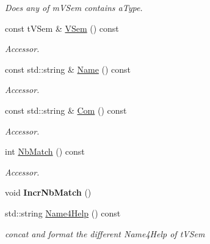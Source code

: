 \begin{DoxyCompactItemize}
\begin{DoxyCompactList}\small\item\em Does any of m\+V\+Sem contains a\+Type. \end{DoxyCompactList}\item 
const t\+V\+Sem \& \hyperlink{classMMVII_1_1cSpecOneArg2007_a4c67e22ddba5a312ef96af49e43d5260}{V\+Sem} () const \hypertarget{classMMVII_1_1cSpecOneArg2007_a4c67e22ddba5a312ef96af49e43d5260}{}\label{classMMVII_1_1cSpecOneArg2007_a4c67e22ddba5a312ef96af49e43d5260}

\begin{DoxyCompactList}\small\item\em Accessor. \end{DoxyCompactList}\item 
const std\+::string \& \hyperlink{classMMVII_1_1cSpecOneArg2007_a0c58980479f2783d16c65aa87285840a}{Name} () const \hypertarget{classMMVII_1_1cSpecOneArg2007_a0c58980479f2783d16c65aa87285840a}{}\label{classMMVII_1_1cSpecOneArg2007_a0c58980479f2783d16c65aa87285840a}

\begin{DoxyCompactList}\small\item\em Accessor. \end{DoxyCompactList}\item 
const std\+::string \& \hyperlink{classMMVII_1_1cSpecOneArg2007_aa898634b28677fafe9a070c6fa3c9594}{Com} () const \hypertarget{classMMVII_1_1cSpecOneArg2007_aa898634b28677fafe9a070c6fa3c9594}{}\label{classMMVII_1_1cSpecOneArg2007_aa898634b28677fafe9a070c6fa3c9594}

\begin{DoxyCompactList}\small\item\em Accessor. \end{DoxyCompactList}\item 
int \hyperlink{classMMVII_1_1cSpecOneArg2007_aab0aaa1ce11f52f127e6efdb37499490}{Nb\+Match} () const \hypertarget{classMMVII_1_1cSpecOneArg2007_aab0aaa1ce11f52f127e6efdb37499490}{}\label{classMMVII_1_1cSpecOneArg2007_aab0aaa1ce11f52f127e6efdb37499490}

\begin{DoxyCompactList}\small\item\em Accessor. \end{DoxyCompactList}\item 
void {\bfseries Incr\+Nb\+Match} ()\hypertarget{classMMVII_1_1cSpecOneArg2007_aece45b5481114f3f40042f8ab30d3ad2}{}\label{classMMVII_1_1cSpecOneArg2007_aece45b5481114f3f40042f8ab30d3ad2}

\item 
std\+::string \hyperlink{classMMVII_1_1cSpecOneArg2007_aa0733d8fb83e77ab6df90280d7df5121}{Name4\+Help} () const \hypertarget{classMMVII_1_1cSpecOneArg2007_aa0733d8fb83e77ab6df90280d7df5121}{}\label{classMMVII_1_1cSpecOneArg2007_aa0733d8fb83e77ab6df90280d7df5121}

\begin{DoxyCompactList}\small\item\em concat and format the different Name4\+Help of t\+V\+Sem \end{DoxyCompactList}\end{DoxyCompactItemize}
